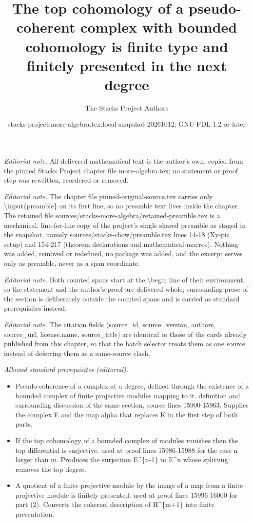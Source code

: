 \documentclass[10pt,a4paper]{amsart}
\title{The top cohomology of a pseudo-coherent complex with bounded cohomology is finite type and finitely presented in the next degree}
\author{The Stacks Project Authors}
\date{stacks-project:more-algebra.tex:local-snapshot-20261012; GNU FDL 1.2 or later}
\theoremstyle{plain}
\theoremstyle{definition}
\theoremstyle{remark}
\numberwithin{equation}{subsection}
\begin{document}
\maketitle
\setcounter{subsection}{1}
\noindent\textit{Editorial note.} All delivered mathematical text is the author's own, copied from the pinned Stacks Project chapter file more-algebra.tex; no statement or proof step was rewritten, reordered or removed.\par\medskip
\noindent\textit{Editorial note.} The chapter file pinned-original-source.tex carries only \textbackslash{}input\{preamble\} on its first line, so no preamble text lives inside the chapter. The retained file sources/stacks-more-algebra/retained-preamble.tex is a mechanical, line-for-line copy of the project's single shared preamble as staged in the snapshot, namely sources/stacks-chow/preamble.tex lines 14-18 (Xy-pic setup) and 154-217 (theorem declarations and mathematical macros). Nothing was added, removed or redefined, no package was added, and the excerpt serves only as preamble, never as a span coordinate.\par\medskip
\noindent\textit{Editorial note.} Both counted spans start at the \textbackslash{}begin line of their environment, so the statement and the author's proof are delivered whole; surrounding prose of the section is deliberately outside the counted spans and is carried as standard prerequisites instead.\par\medskip
\noindent\textit{Editorial note.} The citation fields (source\_id, source\_version, authors, source\_url, license.name, source\_title) are identical to those of the cards already published from this chapter, so that the batch selector treats them as one source instead of deferring them as a same-source clash.\par\medskip
\noindent\textit{Allowed standard prerequisites (editorial).}\begin{itemize}
\item Pseudo-coherence of a complex at a degree, defined through the existence of a bounded complex of finite projective modules mapping to it. definition and surrounding discussion of the same section, source lines 15900-15963. Supplies the complex E and the map alpha that replaces K in the first step of both parts.
\item If the top cohomology of a bounded complex of modules vanishes then the top differential is surjective. used at proof lines 15986-15988 for the case n larger than m. Produces the surjection E\textasciicircum{}\{n-1\} to E\textasciicircum{}n whose splitting removes the top degree.
\item A quotient of a finite projective module by the image of a map from a finite projective module is finitely presented. used at proof lines 15996-16000 for part (2). Converts the cokernel description of H\textasciicircum{}\{m+1\} into finite presentation.
\end{itemize}\medskip
\end{document}

